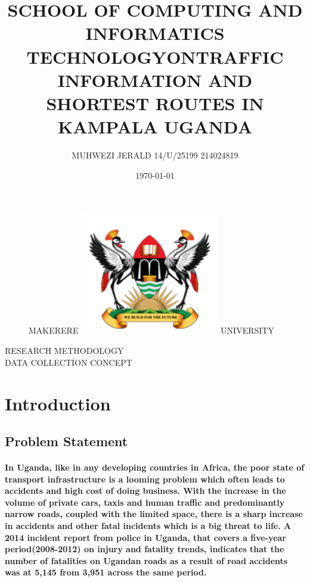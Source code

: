 \documentclass[11pt]{article}
\begin{document}
		
\title{SCHOOL OF COMPUTING AND INFORMATICS\\ TECHNOLOGY}
\author{MUHWEZI JERALD 14/U/25199 214024819}
\date{\today{}}
\begin{figure}
	\begin{center}
	\Huge MAKERERE \includegraphics[width=172pt]{muk.png} \Huge UNIVERSITY
	\end{center}
\end{figure}
	\maketitle
	
	\begin{center}
	RESEARCH METHODOLOGY \\DATA COLLECTION CONCEPT
	\end{center}
\begin{center}
	\title{ON}
\end{center}
	\begin{center}
		\title{TRAFFIC INFORMATION AND SHORTEST ROUTES IN KAMPALA UGANDA}
	\end{center}
   
	\newpage
	\section{ \textbf{Introduction} }
	  
	 \subsection{\textbf{Problem Statement}}
	 \paragraph{\textmd{In Uganda, like in any developing countries in Africa, the poor state of transport infrastructure is a looming problem which often leads to accidents and high cost of doing business. With the increase in the volume of private cars, taxis and human traffic and predominantly narrow roads, coupled with the limited space, there is a sharp increase in accidents and other fatal incidents which is a big threat to life. A 2014 incident report from police in Uganda, that covers a five-year period(2008-2012) on injury and fatality trends, indicates that the number of fatalities on Ugandan roads as a result of road accidents was at 5,145 from 3,951 across the same period.}}
	 
\end{document}
